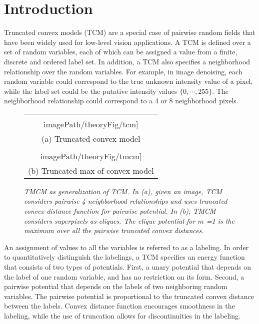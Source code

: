 \documentclass[runningheads]{llncs}
\newcommand{\imagePath}{../images}
\newcommand{\mysection}[1]{\vspace{-2mm}\section{#1}\vspace{-2mm}}
\newcommand{\mycaption}[1]{\vspace{-1mm}\caption{#1}\vspace{-3mm}}
\begin{document}
\vspace{-8mm}
\mysection{Introduction}
Truncated convex models (TCM) are a special case of pairwise random fields that have been widely used for low-level vision
applications. A TCM is defined over a set of random variables, each of which can be assigned a value from a finite, discrete
and ordered label set. 
In addition, a TCM also specifies a neighborhood relationship over the random variables. 
For example, in image denoising, each random variable could correspond to the true unknown intensity
value of a pixel, while the label set could be the putative intensity values $\{0,\cdots,255\}$.
The neighborhood relationship could correspond to a 4 or 8 neighborhood pixels.

\begin{figure}
	\centering
\begin{tabular}{c}
	\texttt{[image: \\imagePath/theoryFig/tcm]} \\
	(a) Truncated convex model \\
	\texttt{[image: \\imagePath/theoryFig/tmcm]} \\ 
	(b) Truncated max-of-convex model \\
\end{tabular}
\vspace{8mm}
\mycaption{\footnotesize \em TMCM as generalization of TCM. In (a), given an image, TCM considers pairwise 4-neighborhood relationships and uses truncated convex distance function for pairwise potential. In (b), TMCM considers superpixels as cliques. The clique potential for $m$ =1 is the maximum over all the pairwise truncated convex distances.}  
\vspace{-5mm}
\label{fig:tmcm_concept}
\end{figure}


An assignment of values to all the variables is referred to as a labeling. In order to quantitatively distinguish the labelings, a TCM
specifies an energy function that consists of two types of potentials. First, a unary potential that depends on the label
of one random variable, and has no restriction on its form. Second, a pairwise potential that depends on the labels of
two neighboring random variables. The pairwise potential is proportional to the truncated convex distance between the
labels. Convex distance function encourages smoothness in the labeling, while the use of truncation allows
for discontinuities in the labeling.
\end{document}
